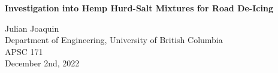 \documentclass[12pt]{article}
\begin{document}
  \begin{center}
    \vspace*{\fill}

    \textbf{Investigation into Hemp Hurd-Salt Mixtures for Road De-Icing}
    \vspace{4em}

    Julian Joaquin \\
    Department of Engineering, University of British Columbia \\
    APSC 171 \\
    December 2nd, 2022

    \vspace*{\fill}
  \end{center}

  \newpage

  

  

  

  

  

  

  \newpage

  \printbibliography
\end{document}
